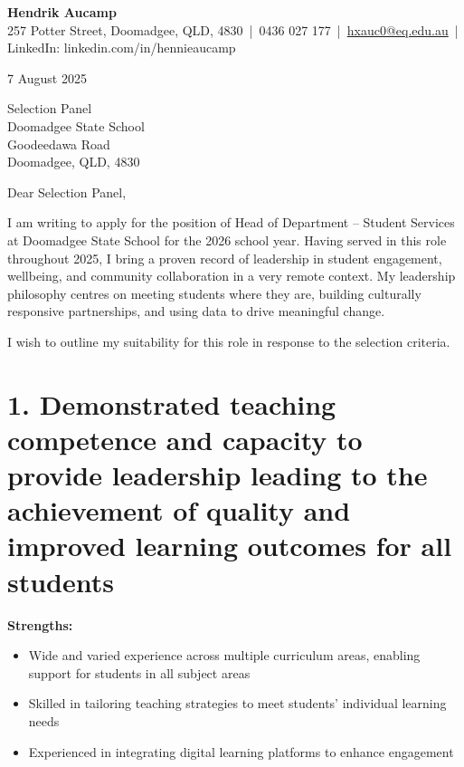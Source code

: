 \documentclass[11pt,a4paper]{article}
\newcommand{\contact}[5]{
    \begin{center}
        {\Huge \textbf{#1}} \\[8pt]
        #2 \,|\, #3 \,|\, \href{mailto:#4}{#4} \,|\, #5
    \end{center}
    \vspace{0.5cm}
}
\begin{document}
\contact{Hendrik Aucamp}
{257 Potter Street, Doomadgee, QLD, 4830}
{0436 027 177}
{hxauc0@eq.edu.au}
{LinkedIn: linkedin.com/in/hennieaucamp}

\begin{flushright}
7 August 2025
\end{flushright}

\vspace{1cm}

Selection Panel \\
Doomadgee State School \\
Goodeedawa Road \\
Doomadgee, QLD, 4830

\vspace{1cm}

Dear Selection Panel,

I am writing to apply for the position of Head of Department – Student Services at Doomadgee State School for the 2026 school year. Having served in this role throughout 2025, I bring a proven record of leadership in student engagement, wellbeing, and community collaboration in a very remote context. My leadership philosophy centres on meeting students where they are, building culturally responsive partnerships, and using data to drive meaningful change.

I wish to outline my suitability for this role in response to the selection criteria.

\section*{1. Demonstrated teaching competence and capacity to provide leadership leading to the achievement of quality and improved learning outcomes for all students}

\textbf{Strengths:}
\begin{itemize}
    \item Wide and varied experience across multiple curriculum areas, enabling support for students in all subject areas
    \item Skilled in tailoring teaching strategies to meet students' individual learning needs
    \item Experienced in integrating digital learning platforms to enhance engagement
\end{itemize}
\end{document}
